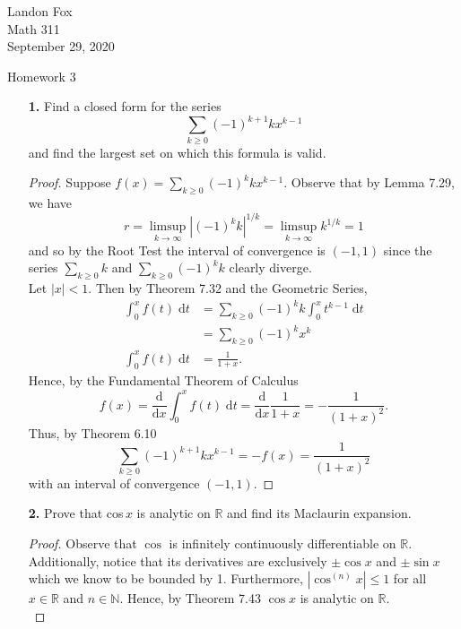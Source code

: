 \documentclass[ 12pt ]{article}
\begin{document}
\noindent Landon Fox \\
\noindent Math 311 \\
\noindent September 29, 2020

\begin{center}
	\Large Homework 3
\end{center}

\begin{enumerate}
	\item[\textbf{1.}] Find a closed form for the series $$\sum_{k \geq 0} (-1)^{k+1}kx^{k-1}$$ and find the largest set on which this formula is valid.

		\begin{proof}
			Suppose $f(x) = \sum_{k \geq 0} (-1)^{k}kx^{k-1}$. Observe that by Lemma 7.29, we have $$r = \limsup_{k \to \infty} |(-1)^k k|^{1/k} = \limsup_{k \to \infty} k^{1/k} = 1$$
			and so by the Root Test the interval of convergence is $(-1, 1)$ since the series $\sum_{k \geq 0} k$ and $\sum_{k \geq 0} (-1)^k k$ clearly diverge. \\

			Let $|x| < 1$. Then by Theorem 7.32 and the Geometric Series,
			\begin{align*}
				\int_0^x f(t)\; \mathrm{d}t &= \sum_{k \geq 0} (-1)^k k \int_0^x t^{k-1}\; \mathrm{d}t \\
				&= \sum_{k \geq 0} (-1)^k x^k \\
				\int_0^x f(t)\; \mathrm{d}t &= \frac{1}{1 + x}.
			\end{align*}
			Hence, by the Fundamental Theorem of Calculus $$f(x) = \frac{\mathrm{d}}{\mathrm{d}x} \int_0^x f(t)\; \mathrm{d}t = \frac{\mathrm{d}}{\mathrm{d}x} \frac{1}{1 + x} =
			-\frac{1}{(1 + x)^2}.$$ Thus, by Theorem 6.10 $$\sum_{k \geq 0} (-1)^{k+1} kx^{k-1} = -f(x) = \frac{1}{(1 + x)^2}$$ with an interval of convergence $(-1, 1)$.
		\end{proof}


	\item[\textbf{2.}] Prove that cos$\,x$ is analytic on $\mathbb{R}$ and find its Maclaurin expansion.

		\begin{proof}
			Observe that $\cos$ is infinitely continuously differentiable on $\mathbb{R}$. Additionally, notice that its derivatives are exclusively $\pm \cos x$ and $\pm \sin x$ which
			we know to be bounded by 1. Furthermore, $|\cos^{(n)}x| \leq 1$ for all $x \in \mathbb{R}$ and $n \in \mathbb{N}$. Hence, by Theorem 7.43 $\cos x$ is analytic on $\mathbb{R}$.
			\\


\end{proof}
\end{enumerate}
\end{document}
